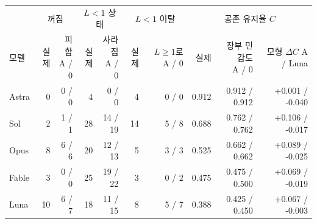\begin{tabular}{lrrrrrrrrr}
\toprule
 & \multicolumn{2}{c}{꺼짐} & \multicolumn{2}{c}{$L<1$ 상태} & \multicolumn{2}{c}{$L<1$ 이탈} & \multicolumn{3}{c}{공존 유지율 $C$} \\
\cmidrule(lr){2-3}\cmidrule(lr){4-5}\cmidrule(lr){6-7}\cmidrule(l){8-10}
모델 & 실제 & \shortstack{피함\\A / 0} & 실제 & \shortstack{사라짐\\A / 0} & 실제 & \shortstack{$L\geq1$로\\A / 0} & 실제 & \shortstack{장부 민감도\\A / 0} & \shortstack{모형 $\Delta C$\\A / Luna} \\
\midrule
Astra & 0 & 0 / 0 & 4 & 0 / 0 & 4 & 0 / 0 & 0.912 & 0.912 / 0.912 & +0.001 / -0.040 \\
Sol & 2 & 1 / 1 & 28 & 14 / 19 & 14 & 5 / 8 & 0.688 & 0.762 / 0.762 & +0.106 / -0.017 \\
Opus & 8 & 6 / 6 & 20 & 12 / 13 & 5 & 3 / 3 & 0.525 & 0.662 / 0.662 & +0.089 / -0.025 \\
Fable & 3 & 0 / 0 & 25 & 19 / 22 & 3 & 0 / 2 & 0.475 & 0.475 / 0.500 & +0.069 / -0.019 \\
Luna & 10 & 6 / 7 & 18 & 11 / 15 & 8 & 5 / 7 & 0.388 & 0.425 / 0.450 & +0.067 / -0.003 \\
\bottomrule
\end{tabular}
